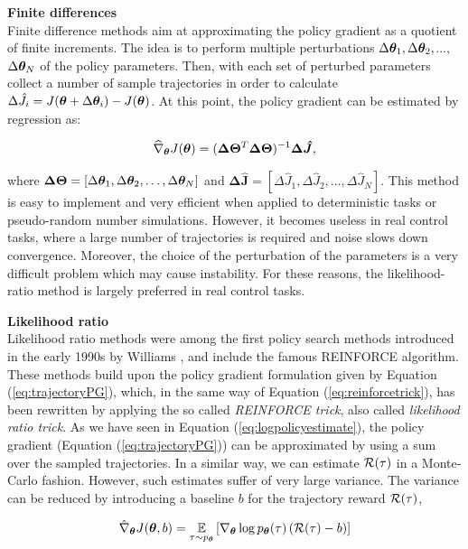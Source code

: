 \textbf{Finite differences}\\
Finite difference methods aim at approximating the policy gradient as a quotient of finite increments. The idea is to perform multiple perturbations $\Delta\boldsymbol{\theta}_1,\Delta\boldsymbol{\theta}_2,$...,$\Delta\boldsymbol{\theta}_N$ of the policy parameters. Then, with each set of perturbed parameters collect a number of sample trajectories in order to calculate $\Delta\hat{J}_i=J(\boldsymbol{\theta}+\Delta\boldsymbol{\theta}_i)-J(\boldsymbol{\theta})$. At this point, the policy gradient can be estimated by regression as:

\begin{align}
\widehat{\nabla}_{\boldsymbol{\theta}}J(\boldsymbol{\theta})=(\boldsymbol{\Delta\Theta}^T\boldsymbol{\Delta\Theta})^{-1}\boldsymbol{\Delta\hat{J}},
\end{align}

where $\boldsymbol{\Delta\Theta}=[\Delta\boldsymbol{\theta}_1, \Delta\boldsymbol{\theta}_2, \dots, \Delta\boldsymbol{\theta}_N]$ and $\boldsymbol{\Delta\hat{J}}=[\Delta\hat{J}_1,\Delta\hat{J}_2,\dots,\Delta\hat{J}_N]$. This method
is easy to implement and very efficient when applied to deterministic tasks or pseudo-random number simulations. However, it becomes useless in real control tasks, where a large number of trajectories is required and noise slows down convergence. Moreover, the choice of the perturbation of the parameters is a very difficult problem which may cause instability. For these reasons, the likelihood-ratio method is largely preferred in real control tasks.

\textbf{Likelihood ratio}\\
Likelihood ratio methods were among the first policy search methods
introduced in the early 1990s by Williams \cite{williams1992simple}, and include the famous REINFORCE algorithm. These methods build upon the policy gradient formulation given by Equation (\ref{eq:trajectoryPG}), which, in the same way of Equation (\ref{eq:reinforcetrick}), has been rewritten by applying the so called \emph{REINFORCE trick}, also called \emph{likelihood ratio trick}. As we have seen in Equation (\ref{eq:logpolicyestimate}), the policy gradient (Equation (\ref{eq:trajectoryPG})) can be approximated by using a sum over the sampled trajectories. In a similar way, we can estimate $\mathcal{R}(\tau)$ in a Monte-Carlo fashion. However, such estimates suffer of very large variance. The variance can be reduced by introducing a baseline $b$ for the trajectory reward $\mathcal{R}(\tau)$, \ie

\begin{align}
\hat{\nabla}_{\boldsymbol{\theta}}J(\boldsymbol{\theta}, b) = \underset{\tau\sim p_{\boldsymbol{\theta}}}{\mathbb{E}}\left[{\nabla_{\boldsymbol{\theta}}\log p_{\boldsymbol{\theta}}(\tau)\left(\mathcal{R}(\tau)-b\right)}\right] \label{eq:PGbaseline}
\end{align}


